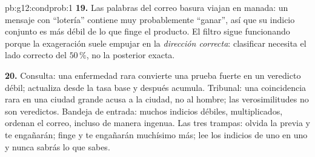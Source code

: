 \begin{solution}{pb:g12:condprob:1}
\textbf{19.} Las palabras del correo basura viajan en manada: un mensaje
con ``lotería'' contiene muy probablemente ``ganar'', así que su indicio
conjunto es más débil de lo que finge el producto. El filtro sigue
funcionando porque la exageración suele empujar en la \emph{dirección
correcta}: clasificar necesita el lado correcto del $50\,\%$, no la
 posterior exacta.

\textbf{20.} Consulta: una enfermedad rara convierte una prueba fuerte en
un veredicto débil; actualiza desde la tasa base y después acumula.
Tribunal: una coincidencia rara en una ciudad grande acusa a la ciudad, no
al hombre; las verosimilitudes no son veredictos. Bandeja de entrada:
muchos indicios débiles, multiplicados, ordenan el correo, incluso de
manera ingenua. Las tres trampas: olvida la  previa y te
engañarán; finge  y te engañarán muchísimo más; lee los
indicios de uno en uno y nunca sabrás lo que sabes.
\end{solution}
